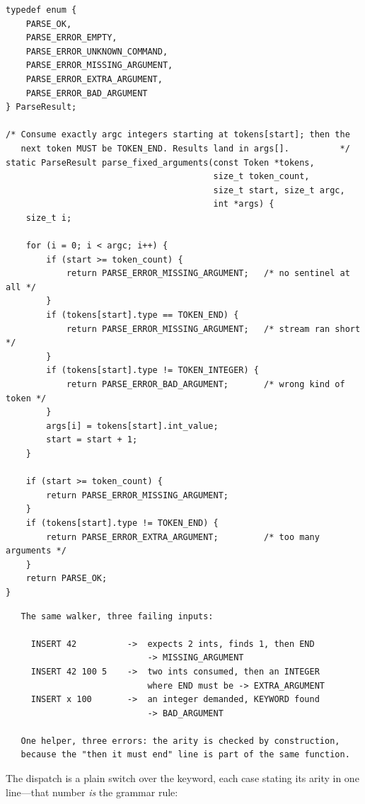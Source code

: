\begin{lstlisting}[caption={The exact-arity engine shared by every command.}]
typedef enum {
    PARSE_OK,
    PARSE_ERROR_EMPTY,
    PARSE_ERROR_UNKNOWN_COMMAND,
    PARSE_ERROR_MISSING_ARGUMENT,
    PARSE_ERROR_EXTRA_ARGUMENT,
    PARSE_ERROR_BAD_ARGUMENT
} ParseResult;

/* Consume exactly argc integers starting at tokens[start]; then the
   next token MUST be TOKEN_END. Results land in args[].          */
static ParseResult parse_fixed_arguments(const Token *tokens,
                                         size_t token_count,
                                         size_t start, size_t argc,
                                         int *args) {
    size_t i;

    for (i = 0; i < argc; i++) {
        if (start >= token_count) {
            return PARSE_ERROR_MISSING_ARGUMENT;   /* no sentinel at all */
        }
        if (tokens[start].type == TOKEN_END) {
            return PARSE_ERROR_MISSING_ARGUMENT;   /* stream ran short */
        }
        if (tokens[start].type != TOKEN_INTEGER) {
            return PARSE_ERROR_BAD_ARGUMENT;       /* wrong kind of token */
        }
        args[i] = tokens[start].int_value;
        start = start + 1;
    }

    if (start >= token_count) {
        return PARSE_ERROR_MISSING_ARGUMENT;
    }
    if (tokens[start].type != TOKEN_END) {
        return PARSE_ERROR_EXTRA_ARGUMENT;         /* too many arguments */
    }
    return PARSE_OK;
}
\end{lstlisting}

\begin{verbatim}
   The same walker, three failing inputs:

     INSERT 42          ->  expects 2 ints, finds 1, then END
                            -> MISSING_ARGUMENT
     INSERT 42 100 5    ->  two ints consumed, then an INTEGER
                            where END must be -> EXTRA_ARGUMENT
     INSERT x 100       ->  an integer demanded, KEYWORD found
                            -> BAD_ARGUMENT

   One helper, three errors: the arity is checked by construction,
   because the "then it must end" line is part of the same function.
\end{verbatim}

The dispatch is a plain switch over the keyword, each case stating its
arity in one line---that number \emph{is} the grammar rule:

